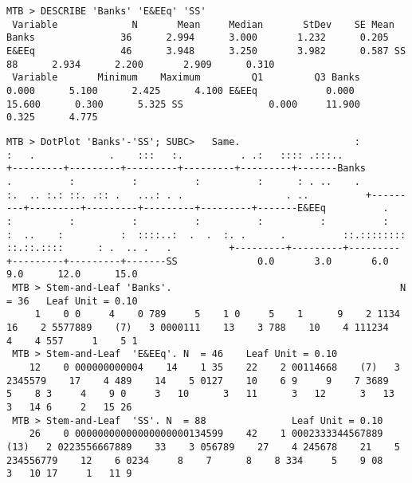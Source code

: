 \documentclass[a4paper,12pt]{article}
\begin{document}
\begin{framed}
\begin{verbatim} 
MTB > DESCRIBE 'Banks' 'E&EEq' 'SS' 
 Variable             N       Mean     Median       StDev    SE Mean Banks               36      2.994      3.000       1.232      0.205 E&EEq               46      3.948      3.250       3.982      0.587 SS                  88      2.934      2.200       2.909      0.310 
 Variable       Minimum    Maximum         Q1         Q3 Banks            0.000      5.100      2.425      4.100 E&EEq            0.000     15.600      0.300      5.325 SS               0.000     11.900      0.325      4.775 
\end{verbatim}

\begin{verbatim}
MTB > DotPlot 'Banks'-'SS'; SUBC>   Same.                    :                    :   .             .    :::   :.          . .:   :::: .:::..          +---------+---------+---------+---------+---------+-------Banks          .          :          :          :          :      : . ..    .          :.  .. :.: ::. .:: .   ...: . .                  . ..          +---------+---------+---------+---------+---------+-------E&EEq          .          :          :          :          :          :          :          :          :  ..    :          :  ::::..:  .  .  :. .      .          ::.:::::::: ::.::.::::      : .  .. .   .          +---------+---------+---------+---------+---------+-------SS              0.0       3.0       6.0       9.0      12.0      15.0 
 MTB > Stem-and-Leaf 'Banks'.                                        N  = 36   Leaf Unit = 0.10 
     1    0 0     4    0 789     5    1 0     5    1      9    2 1134    16    2 5577889    (7)   3 0000111    13    3 788    10    4 111234     4    4 557     1    5 1 
 MTB > Stem-and-Leaf  'E&EEq'. N  = 46    Leaf Unit = 0.10 
    12    0 000000000004    14    1 35    22    2 00114668    (7)   3 2345579    17    4 489    14    5 0127    10    6 9     9    7 3689     5    8 3     4    9 0     3   10      3   11      3   12      3   13      3   14 6     2   15 26 
 MTB > Stem-and-Leaf  'SS'. N  = 88               Leaf Unit = 0.10 
    26    0 00000000000000000000134599    42    1 0002333344567889   (13)   2 0223556667889    33    3 056789    27    4 245678    21    5 234556779    12    6 0234     8    7      8    8 334     5    9 08     3   10 17     1   11 9 
\end{verbatim} 
\end{framed}
\end{document}
